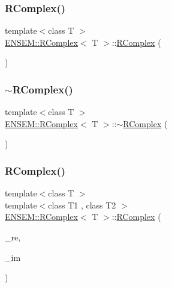 \subsubsection{\texorpdfstring{RComplex()}{RComplex()}\hspace{0.1cm}{\footnotesize\ttfamily [1/12]}}
{\footnotesize\ttfamily template$<$class T $>$ \\
\mbox{\hyperlink{classENSEM_1_1RComplex}{E\+N\+S\+E\+M\+::\+R\+Complex}}$<$ T $>$\+::\mbox{\hyperlink{classENSEM_1_1RComplex}{R\+Complex}} (\begin{DoxyParamCaption}{ }\end{DoxyParamCaption})\hspace{0.3cm}{\ttfamily [inline]}}

\mbox{\label{classENSEM_1_1RComplex_a6e888c12c12f117dab2c0fd122b7b8d7}} 
\subsubsection{\texorpdfstring{$\sim$RComplex()}{~RComplex()}\hspace{0.1cm}{\footnotesize\ttfamily [1/3]}}
{\footnotesize\ttfamily template$<$class T $>$ \\
\mbox{\hyperlink{classENSEM_1_1RComplex}{E\+N\+S\+E\+M\+::\+R\+Complex}}$<$ T $>$\+::$\sim$\mbox{\hyperlink{classENSEM_1_1RComplex}{R\+Complex}} (\begin{DoxyParamCaption}{ }\end{DoxyParamCaption})\hspace{0.3cm}{\ttfamily [inline]}}

\mbox{\label{classENSEM_1_1RComplex_aec74e0e2dcf90ad4b575285662713b9c}} 
\subsubsection{\texorpdfstring{RComplex()}{RComplex()}\hspace{0.1cm}{\footnotesize\ttfamily [2/12]}}
{\footnotesize\ttfamily template$<$class T $>$ \\
template$<$class T1 , class T2 $>$ \\
\mbox{\hyperlink{classENSEM_1_1RComplex}{E\+N\+S\+E\+M\+::\+R\+Complex}}$<$ T $>$\+::\mbox{\hyperlink{classENSEM_1_1RComplex}{R\+Complex}} (\begin{DoxyParamCaption}\item[{const \mbox{\hyperlink{classENSEM_1_1RScalar}{R\+Scalar}}$<$ T1 $>$ \&}]{\+\_\+re,  }\item[{const \mbox{\hyperlink{classENSEM_1_1RScalar}{R\+Scalar}}$<$ T2 $>$ \&}]{\+\_\+im }\end{DoxyParamCaption})\hspace{0.3cm}{\ttfamily [inline]}}



